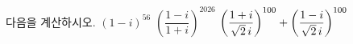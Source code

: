 다음을 계산하시오.
 $(1-i)^{56}$
 $\left(\dfrac{1-i}{1+i}\right)^{2026}$
 $\left(\dfrac{1+i}{\sqrt{2}\mkern3mu i}\right)^{100}+\left(\dfrac{1-i}{\sqrt{2}\mkern3mu i}\right)^{100}$
